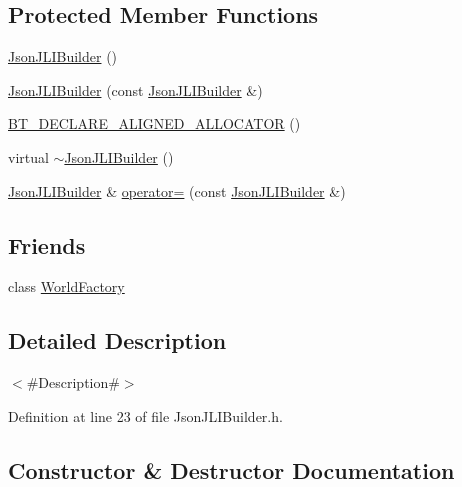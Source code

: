 \subsection*{Protected Member Functions}
\begin{DoxyCompactItemize}
\item 
\mbox{\hyperlink{classnjli_1_1_json_j_l_i_builder_af1ae069dff60a0ff1ed7ec2e96da0b0c}{Json\+J\+L\+I\+Builder}} ()
\item 
\mbox{\hyperlink{classnjli_1_1_json_j_l_i_builder_a30519a014f411a10616ad43dddf2b740}{Json\+J\+L\+I\+Builder}} (const \mbox{\hyperlink{classnjli_1_1_json_j_l_i_builder}{Json\+J\+L\+I\+Builder}} \&)
\item 
\mbox{\hyperlink{classnjli_1_1_json_j_l_i_builder_acace1c21eb9594170cee3bcd78f2ba52}{B\+T\+\_\+\+D\+E\+C\+L\+A\+R\+E\+\_\+\+A\+L\+I\+G\+N\+E\+D\+\_\+\+A\+L\+L\+O\+C\+A\+T\+OR}} ()
\item 
virtual \mbox{\hyperlink{classnjli_1_1_json_j_l_i_builder_adae7742dc510d8f9b483f02ea24ecd9f}{$\sim$\+Json\+J\+L\+I\+Builder}} ()
\item 
\mbox{\hyperlink{classnjli_1_1_json_j_l_i_builder}{Json\+J\+L\+I\+Builder}} \& \mbox{\hyperlink{classnjli_1_1_json_j_l_i_builder_a305951bf3f57185cb22bebea68529f16}{operator=}} (const \mbox{\hyperlink{classnjli_1_1_json_j_l_i_builder}{Json\+J\+L\+I\+Builder}} \&)
\end{DoxyCompactItemize}
\subsection*{Friends}
\begin{DoxyCompactItemize}
\item 
class \mbox{\hyperlink{classnjli_1_1_json_j_l_i_builder_acb96ebb09abe8f2a37a915a842babfac}{World\+Factory}}
\end{DoxyCompactItemize}


\subsection{Detailed Description}
$<$\#\+Description\#$>$ 

Definition at line 23 of file Json\+J\+L\+I\+Builder.\+h.



\subsection{Constructor \& Destructor Documentation}
\mbox{\label{classnjli_1_1_json_j_l_i_builder_af1ae069dff60a0ff1ed7ec2e96da0b0c}} 
